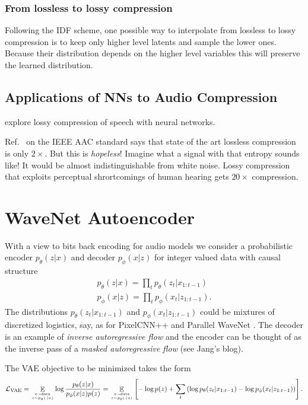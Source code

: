 \documentclass[preprint,notitlepage]{revtex4-1}
\newcommand*{\cL}{{\mathcal L}}
\DeclareMathOperator*{\E}{\mathbb{E}}
\begin{document}
\subsubsection{From lossless to lossy compression}

Following the IDF scheme, one possible way to interpolate from lossless to lossy compression is to keep only higher level latents and sample the lower ones. Because their distribution depends on the higher level variables this will preserve the learned distribution.

\subsection{Applications of NNs to Audio Compression}

\cite{Kankanahalli:2018aa,Garbacea:2019aa} explore lossy compression of speech with neural networks.

Ref.~\cite{Huang:2014aa} on the IEEE AAC standard says that state of the art lossless compression is only $2\times$. But this is \emph{hopeless}! Imagine what a signal with that entropy sounds like! It would be almost indistinguishable from white noise. Lossy compression that exploits perceptual shrortcomings of human hearing gets $20\times$ compression.

\section{WaveNet Autoencoder}

With a view to bits back encoding for audio models we consider a probabilistic encoder $p_\theta(z|x)$ and decoder $p_\phi(x|z)$ for integer valued data with causal structure
%
\begin{align}
  p_\theta(z|x) = \prod_t p_\theta(z_t|x_{1:t-1})\\
  p_\phi(x|z) = \prod_t p_\phi(x_t|z_{1:t-1}).
\end{align}
%
The distributions $p_\theta(z_t|x_{1:t-1})$ and $p_\phi(x_t|z_{1:t-1})$ could be mixtures of discretized logistics, say, as for PixelCNN++ and Parallel WaveNet \cite{Oord:2017aa}. The decoder is an example of \emph{inverse autoregressive flow} and the encoder can be thought of as the inverse pass of a \emph{masked autoregressive flow} (see Jang's blog).

The VAE objective to be minimized takes the form
%
\begin{equation}\label{eq:vae_obj}
\cL_\text{VAE}=
  \E_{x\sim\text{data} \atop z \sim p_\theta(\cdot|x)} \log\frac{p_\theta(z|x)}{p_\phi(x|z)p(z)} = \E_{x\sim\text{data} \atop z \sim p_\theta(\cdot|x)} \left[-\log p(z) + \sum_t \left(\log p_\theta(z_t|x_{1:t-1}) - \log p_\phi(x_t|z_{1:t-1})\right)\right].
\end{equation}
%
\end{document}
